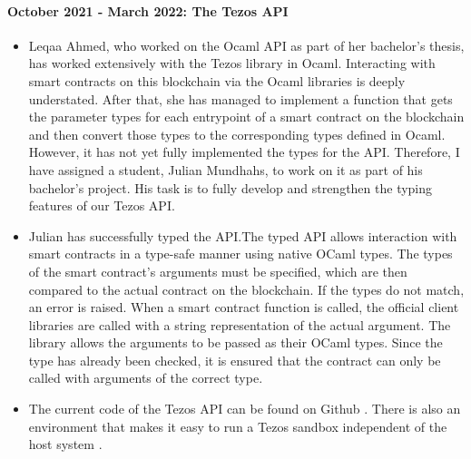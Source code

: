 \documentclass[a4paper,11pt]{article}
\begin{document}
\paragraph{October 2021 - March 2022: The Tezos API} 
\begin{itemize}
\item Leqaa Ahmed, who worked on the Ocaml API as part of her bachelor's thesis, has worked extensively with the Tezos library in Ocaml. Interacting with smart contracts on this blockchain via the Ocaml libraries is deeply understated. After that, she has managed to implement a function that gets the parameter types for each entrypoint of a smart contract on the blockchain and then convert those types to the corresponding types defined in Ocaml. However, it has not yet fully implemented the types for the API. Therefore, I have assigned a student, Julian Mundhahs, to work on it as part of his bachelor's project. His task is to fully develop and strengthen the typing features of our Tezos API.
\item Julian has successfully typed the API.The typed API allows interaction with smart contracts in a type-safe manner using native OCaml types. The types of the smart contract's arguments must be specified, which are then compared to the actual contract on the blockchain. If the types do not match, an error is raised. When a smart contract function is called, the official client libraries are called with a string representation of the actual argument. The library allows the arguments to be passed as their OCaml types. Since the type has already been checked, it is ensured that the contract can only be called with arguments of the correct type. 
\item  The current code of the Tezos API can be found on Github \cite{tezos-api-update}. There is also an environment that makes it easy to run a Tezos sandbox independent of the host system \cite{tezos-api-devenv}.
\end{itemize}
 
\end{document}
